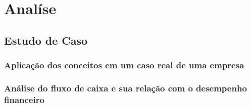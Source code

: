 \chapter{Anal\'ise}\label{chp:analysis}

\noindent
\hspace{0.635cm}


\section{Estudo de Caso}

\subsection{Aplicação dos conceitos em um caso real de uma empresa}
\subsection{Análise do fluxo de caixa e sua relação com o desempenho financeiro}